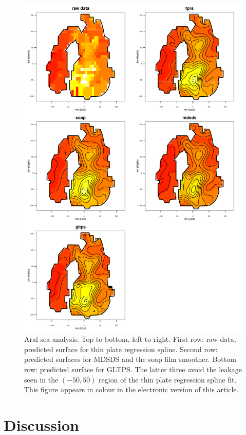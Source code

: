 \documentclass[smallextended]{svjour3}       %
\begin{document}
\begin{figure}
\centering
\includegraphics[height=0.8\textheight]{examples/aral/aral-plot.pdf}
\caption{Aral sea analysis. Top to bottom, left to right. First row: raw data, predicted surface for thin plate regression spline. Second row: predicted surfaces for MDSDS and the soap film smoother. Bottom row: predicted surface for GLTPS. The latter three avoid the leakage seen in the $(-50, 50)$ region of the thin plate regression spline fit. This figure appears in colour in the electronic version of this article.}
\label{aral-plot}
\end{figure}

\section{Discussion}
\label{conclusion}
\end{document}

